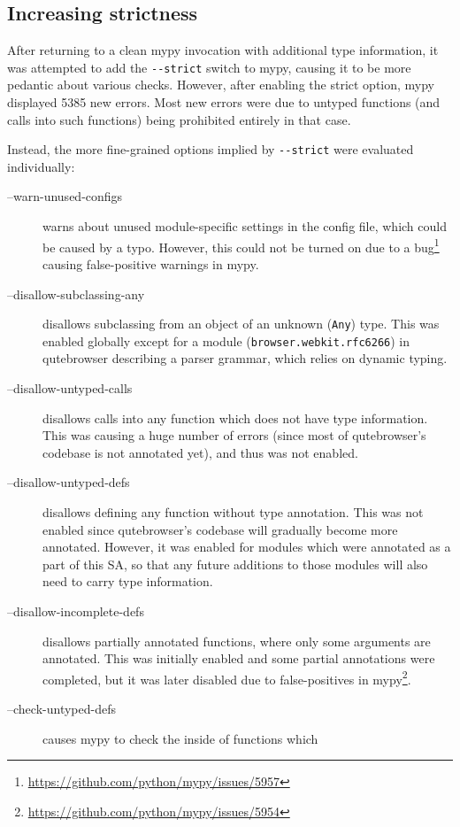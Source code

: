 \documentclass[a4paper,parskip=full,DIV=14,BCOR=15mm]{scrreprt}
\begin{document}
\subsection{Increasing strictness}

After returning to a clean mypy invocation with additional type information, it
was attempted to add the \verb|--strict| switch to mypy, causing it to be more
pedantic about various checks. However, after enabling the strict option, mypy
displayed 5385 new errors. Most new errors were due to untyped functions (and
calls into such functions) being prohibited entirely in that case.

Instead, the more fine-grained options implied by \verb|--strict| were evaluated
individually:

\begin{description}
  \item[--warn-unused-configs] warns about unused module-specific settings in
    the config file, which could be caused by a typo. However, this could not be
    turned on due to a
    bug\footnote{\url{https://github.com/python/mypy/issues/5957}} causing
    false-positive warnings in mypy.
  \item[--disallow-subclassing-any] disallows subclassing from an object of an
    unknown (\verb|Any|) type. This was enabled globally except for a
    module (\verb|browser.webkit.rfc6266|) in qutebrowser describing a parser
    grammar, which relies on dynamic typing.
  \item[--disallow-untyped-calls] disallows calls into any function which does
    not have type information. This was causing a huge number of errors (since
    most of qutebrowser's codebase is not annotated yet), and thus was not
    enabled.
  \item[--disallow-untyped-defs] disallows defining any function without type
    annotation. This was not enabled since qutebrowser's codebase will gradually
    become more annotated. However, it was enabled for modules which were
    annotated as a part of this SA, so that any future additions to those
    modules will also need to carry type information.
  \item[--disallow-incomplete-defs] disallows partially annotated functions,
    where only some arguments are annotated. This was initially enabled and
    some partial annotations were completed, but it was later disabled due to
    false-positives in
    mypy\footnote{\url{https://github.com/python/mypy/issues/5954}}.
  \item[--check-untyped-defs] causes mypy to check the inside of functions which

\end{description}
\end{document}
